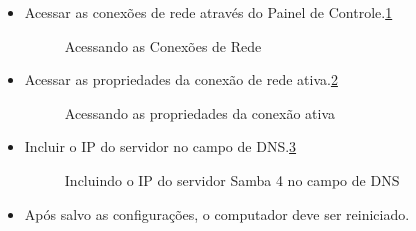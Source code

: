 \begin{itemize}
	\item Acessar as conexões de rede através do Painel de Controle.\ref{conexoes_rede}
	\begin{figure}[ht]
			\centering
			\caption{Acessando as Conexões de Rede}
			\label{conexoes_rede}
	\end{figure}	
	\item Acessar as propriedades da conexão de rede ativa.\ref{propriedades_conexao}
	\begin{figure}[h!]
			\centering
			\caption{Acessando as propriedades da conexão ativa}
			\label{propriedades_conexao}
	\end{figure}
	
	\pagebreak
	
	\item Incluir o IP do servidor no campo de DNS.\ref{propriedades_tcpip}
	\begin{figure}[ht]
			\centering
			\caption{Incluindo o IP do servidor Samba 4 no campo de DNS}
			\label{propriedades_tcpip}
	\end{figure}
	
	\item Após salvo as configurações, o computador deve ser reiniciado.
	
\end{itemize}